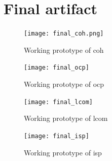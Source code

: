 \section{Final artifact}
\begin{figure}
    \centering
    \texttt{[image: final\_coh.png]}
    \caption{Working prototype of \gls{coh}}
\end{figure}

\begin{figure}
    \centering
    \texttt{[image: final\_ocp]}
    \caption{Working prototype of \gls{ocp}}
\end{figure}

\begin{figure}
    \centering
    \texttt{[image: final\_lcom]}
    \caption{Working prototype of \gls{lcom}}
\end{figure}

\begin{figure}
    \centering
    \texttt{[image: final\_isp]}
    \caption{Working prototype of \gls{isp}}
\end{figure}


